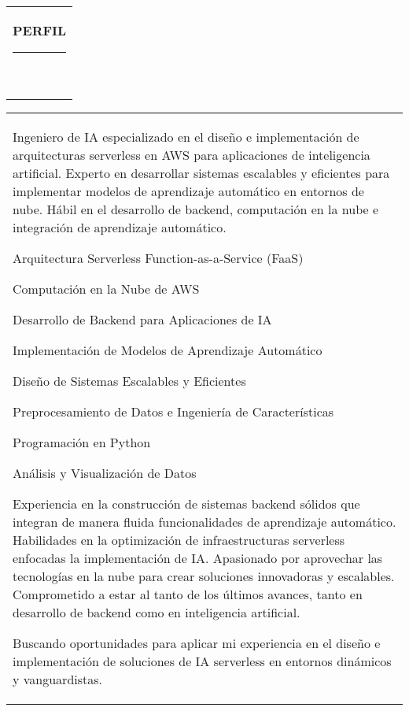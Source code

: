 \documentclass[10pt,A4]{article}
\newcommand{\mpwidth}{\linewidth-\fboxsep-\fboxsep}
\newcommand{\cvlist}[1] {
	\begin{itemize}{#1}\end{itemize}
}
\newcommand{\cvtext}[1] {
	\begin{tabular*}{1\mpwidth}{p{0.98\mpwidth}}
		\parbox{1\mpwidth}{#1}
	\end{tabular*}
}
\newcommand{\cvsection}[1] {
	\vspace{14pt}
	\cvtext{
		\textbf{\LARGE{\textcolor{darkcol}{\uppercase{#1}}}}\\[-4pt]
		\textcolor{maincol}{ \rule{0.1\textwidth}{2pt} } \\
	}
}
\begin{document}
\begin{paracol}{2}
\begin{rightcolumn}
\vfill\null
\cvsection{PERFIL}

\cvtext{
Ingeniero de IA especializado en el diseño e implementación de arquitecturas serverless en AWS para aplicaciones de inteligencia artificial. Experto en desarrollar sistemas escalables y eficientes para implementar modelos de aprendizaje automático en entornos de nube. Hábil en el desarrollo de backend, computación en la nube e integración de aprendizaje automático.

\cvlist{
\item Arquitectura Serverless Function-as-a-Service (FaaS)
\item Computación en la Nube de AWS
\item Desarrollo de Backend para Aplicaciones de IA
\item Implementación de Modelos de Aprendizaje Automático
\item Diseño de Sistemas Escalables y Eficientes
\item Preprocesamiento de Datos e Ingeniería de Características
\item Programación en Python
\item Análisis y Visualización de Datos
}

Experiencia en la construcción de sistemas backend sólidos que integran de manera fluida funcionalidades de aprendizaje automático. Habilidades en la optimización de infraestructuras serverless enfocadas la implementación de IA. Apasionado por aprovechar las tecnologías en la nube para crear soluciones innovadoras y escalables. Comprometido a estar al tanto de los últimos avances, tanto en desarrollo de backend como en inteligencia artificial.

Buscando oportunidades para aplicar mi experiencia en el diseño e implementación de soluciones de IA serverless en entornos dinámicos y vanguardistas.
}




\end{rightcolumn}
\end{paracol}
\end{document}
